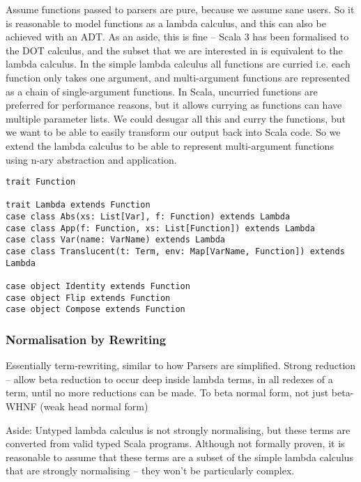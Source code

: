 \documentclass[../../main.tex]{subfiles}
\begin{document}
Assume functions passed to parsers are pure, because we assume sane users.
So it is reasonable to model functions as a lambda calculus, and this can also be achieved with an ADT.
As an aside, this is fine -- Scala 3 has been formalised to the DOT calculus, and the subset that we are interested in is equivalent to the lambda calculus.
In the simple lambda calculus all functions are curried i.e. each function only takes one argument, and multi-argument functions are represented as a chain of single-argument functions.
In Scala, uncurried functions are preferred for performance reasons, but it allows currying as functions can have multiple parameter lists.
We could desugar all this and curry the functions, but we want to be able to easily transform our output back into Scala code.
So we extend the lambda calculus to be able to represent multi-argument functions using n-ary abstraction and application.

\begin{verbatim}
trait Function

trait Lambda extends Function
case class Abs(xs: List[Var], f: Function) extends Lambda
case class App(f: Function, xs: List[Function]) extends Lambda
case class Var(name: VarName) extends Lambda
case class Translucent(t: Term, env: Map[VarName, Function]) extends Lambda

case object Identity extends Function
case object Flip extends Function
case object Compose extends Function
\end{verbatim}

\subsubsection{Normalisation by Rewriting}
Essentially term-rewriting, similar to how Parsers are simplified.
Strong reduction -- allow beta reduction to occur deep inside lambda terms, in all redexes of a term, until no more reductions can be made.
To beta normal form, not just beta-WHNF (weak head normal form) %

Aside: Untyped lambda calculus is not strongly normalising, but these terms are converted from valid typed Scala programs.
Although not formally proven, it is reasonable to assume that these terms are a subset of the simple lambda calculus that are strongly normalising -- they won't be particularly complex.
\end{document}
